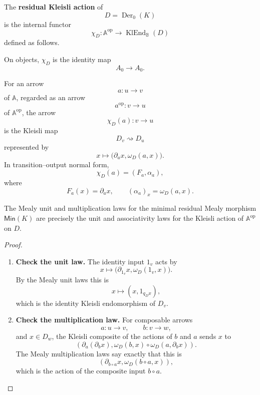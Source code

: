 \begin{definition}
\label{def:syn-to-residual-kleisli-action}
    The \textbf{residual Kleisli action} of
    \[
        D=\operatorname{Der}_0(K)
    \]
    is the internal functor
    \[
        \chi_D:
        \mathbb A^{\mathrm{op}}
        \longrightarrow
        \operatorname{KlEnd}_{\mathbb B}(D)
    \]
    defined as follows.

    On objects, \(\chi_D\) is the identity map
    \[
        A_0\to A_0.
    \]

    For an arrow
    \[
        a:u\to v
    \]
    of \(\mathbb A\), regarded as an arrow
    \[
        a^{\mathrm{op}}:v\to u
    \]
    of \(\mathbb A^{\mathrm{op}}\), the arrow
    \[
        \chi_D(a):v\to u
    \]
    is the Kleisli map
    \[
        D_v\rightsquigarrow D_u
    \]
    represented by
    \[
        x\longmapsto
        \bigl(\partial_a x,\omega_D(a,x)\bigr).
    \]
    In transition--output normal form,
    \[
        \chi_D(a)=(F_a,\alpha_a),
    \]
    where
    \[
        F_a(x)=\partial_a x,
        \qquad
        (\alpha_a)_x=\omega_D(a,x).
    \]
\end{definition}

\begin{proposition}
\label{prop:syn-to-mealy-laws-kleisli-action-laws}
    The Mealy unit and multiplication laws for the minimal residual Mealy
    morphism \(\mathsf{Min}(K)\) are precisely the unit and associativity laws
    for the Kleisli action of \(\mathbb A^{\mathrm{op}}\) on \(D\).
\end{proposition}

\begin{proof}
    \leavevmode
    \begin{enumerate}
        \item \textbf{Check the unit law.}
        The identity input \(1_v\) acts by
        \[
            x\longmapsto
            \bigl(\partial_{1_v}x,\omega_D(1_v,x)\bigr).
        \]
        By the Mealy unit laws this is
        \[
            x\longmapsto
            (x,1_{q_Dx}),
        \]
        which is the identity Kleisli endomorphism of \(D_v\).

        \item \textbf{Check the multiplication law.}
        For composable arrows
        \[
            a:u\to v,
            \qquad
            b:v\to w,
        \]
        and \(x\in D_w\), the Kleisli composite of the actions of \(b\) and
        \(a\) sends \(x\) to
        \[
            \left(
                \partial_a(\partial_bx),
                \omega_D(b,x)\circ\omega_D(a,\partial_bx)
            \right).
        \]
        The Mealy multiplication laws say exactly that this is
        \[
            \left(
                \partial_{b\circ a}x,
                \omega_D(b\circ a,x)
            \right),
        \]
        which is the action of the composite input \(b\circ a\).
    \end{enumerate}
\end{proof}

